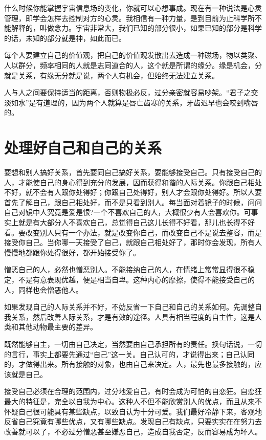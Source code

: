 \documentclass[fontset=fandol, a4paper, 12pt, openright]{ctexbook}
\begin{document}
什么时候你能掌握宇宙信息场的变化，你就可以心想事成。现在有一种说法是心灵管理，即学会怎样去控制对方的心灵。我相信有一种力量，是到目前为止科学所不能解释的，叫做念力。宇宙非常大，我们已知的部分很小，如果已知的部分是科学的话，未知的部分就是神，如此而已。

每个人要建立自己的价值观，把自己的价值观发散出去造成一种磁场，物以类聚、人以群分，频率相同的人就是志同道合的人，这个就是所谓的缘分。缘是机会，分就是关系，有缘无分就是说，两个人有机会，但始终无法建立关系。

人与人之间要保持适当的距离，否则物极必反，过分亲密就容易吵架。“君子之交淡如水”是有道理的，因为两个人就算是唇亡齿寒的关系，牙齿迟早也会咬到嘴唇的。

\section{处理好自己和自己的关系}

要想和别人搞好关系，首先要同自己搞好关系，要能够接受自己。只有接受自己的人，才能使自己的身心得到充分的发展，因而获得和谐的人际关系。你跟自己相处不好，就不会有人跟你处得好；你跟自己处得好，别人才会跟你处得好。所以人要首先了解自己，跟自己相处好，而不是只看到别人。每当面对着镜子的时候，问问自己对镜中人究竟是爱是恨?一个不喜欢自己的人，大概很少有人会喜欢你。可事实上就是有大部分人不喜欢自己，总觉得自己这儿长得不好看，那儿也长得不好看。要改变别人只有一个办法，就是改变你自己，而改变自己不是说去整容，而是接受你自己。当你哪一天接受了自己，就跟自己相处好了，那时你会发现，所有人慢慢地都跟你处得很好，都开始接受你了。

憎恶自己的人，必然也憎恶别人。不能接纳自己的人，在情绪上常常显得很不稳定，不是有意表现优越，便是相当自卑。这种内心的摩擦，使得不能接受自己的人，同样也会憎恶他人。

如果发现自己的人际关系并不好，不妨反省一下自己和自己的关系如何。先调整自我关系，然后改善人际关系，才是有效的途径。人具有相当程度的自主性，这是人类和其他动物最主要的差异。

既然能够自主，一切由自己决定，当然要由自己承担所有的责任。换句话说，一切的言行，事实上都要先通过“自己”这一关。自己认可的，才说得出来；自己认同的，才做得出来。所有接触的对象，也由自己来决定。人，最先也最多接触的，应该就是自己。

接受自己必须在合理的范围内，过分地爱自己，有时会成为可怕的自恋狂。自恋狂最大的特征是，完全以自我为中心。这种人不但不能欣赏别人的优点，而且从来不怀疑自己很可能具有某些缺点，以致自认为十分可爱。我们最好冷静下来，客观地反省自己究竟有哪些优点，又有哪些缺点。发现自己有缺点，只要实实在在努力去改善就可以了，不必过分憎恶甚至嫌恶自己，造成自我否定，反而容易成为坏人。
\end{document}
